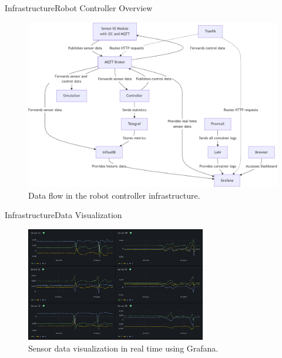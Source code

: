 \documentclass[AIRbeamer
,optEnglish
,optBiber
,optBibstyleAlphabetic
,optBeamerClassicFormat%
]{AIRlatex}
\begin{document}
    \begin{frame}{Infrastructure}{Robot Controller Overview}
        \begin{figure}[H]
            \centering
            \includegraphics[height=0.75\textheight]{figures/diagrams/infrastructure-robot-controller}
            \caption{Data flow in the robot controller infrastructure.}
        \end{figure}
    \end{frame}

    \begin{frame}{Infrastructure}{Data Visualization}
        \begin{figure}[H]
            \centering
            \includegraphics[width=0.7\textwidth]{figures/grafana}
            \caption{Sensor data visualization in real time using Grafana.}
        \end{figure}
    \end{frame}
\end{document}
